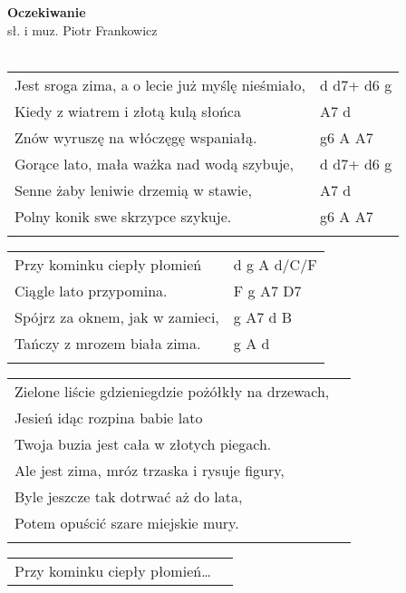 \documentclass[a5paper]{article}
\begin{document}


\noindent
\fontsize{12pt}{15pt}\selectfont
\textbf{Oczekiwanie} \\
\fontsize{8pt}{10pt}\selectfont
sł. i muz. Piotr Frankowicz \\ \\
\fontsize{10pt}{12pt}\selectfont
{}
\begin{tabular}{@{}p{8.00cm}p{3cm}@{}}
\noindent
Jest sroga zima, a o lecie już myślę nieśmiało, & d d7+ d6 g \\
Kiedy z wiatrem i złotą kulą słońca & A7 d \\
Znów wyruszę na włóczęgę wspaniałą. & g6 A A7 \\
Gorące lato, mała ważka nad wodą szybuje, & d d7+ d6 g \\
Senne żaby leniwie drzemią w stawie, & A7 d \\
Polny konik swe skrzypce szykuje. & g6 A A7 \\ \\
\end{tabular}

\noindent
\begin{tabular}{@{}p{7.00cm}p{3cm}@{}}
Przy kominku ciepły płomień & d g A d/C/F \\
Ciągle lato przypomina. & F g A7 D7 \\
Spójrz za oknem, jak w zamieci, & g A7 d B \\
Tańczy z mrozem biała zima. & g A d \\ \\
\end{tabular}

\noindent
\begin{tabular}{@{}p{8.00cm}p{3cm}@{}}
Zielone liście gdzieniegdzie pożółkły na drzewach, \\
Jesień idąc rozpina babie lato \\
Twoja buzia jest cała w złotych piegach. \\
Ale jest zima, mróz trzaska i rysuje figury, \\
Byle jeszcze tak dotrwać aż do lata, \\
Potem opuścić szare miejskie mury. \\ \\
\end{tabular}

\noindent
\begin{tabular}{@{}p{8.00cm}p{3cm}@{}}
Przy kominku ciepły płomień…
\end{tabular}
\end{document}
